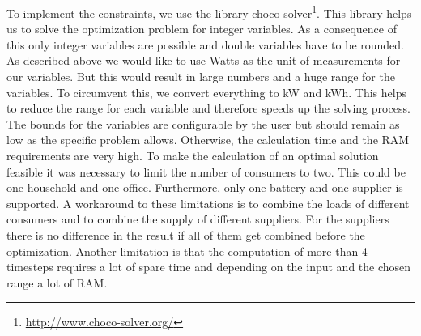 To implement the constraints, we use the library choco solver\footnote{\url{http://www.choco-solver.org/}}. This library helps us to solve the optimization problem for integer variables. As a consequence of this only integer variables are possible and double variables have to be rounded. As described above we would like to use Watts as the unit of measurements for our variables. But this would result in large numbers and a huge range for the variables. To circumvent this, we convert everything to kW and kWh. This helps to reduce the range for each variable and therefore speeds up the solving process. The bounds for the variables are configurable by the user but should remain as low as the specific problem allows. Otherwise, the calculation time and the RAM requirements are very high. To make the calculation of an optimal solution feasible it was necessary to limit the number of consumers to two. This could be one household and one office. Furthermore, only one battery and one supplier is supported. A workaround to these limitations is to combine the loads of different consumers and to combine the supply of different suppliers. For the suppliers there is no difference in the result if all of them get combined before the optimization. Another limitation is that the computation of more than 4 timesteps requires a lot of spare time and depending on the input and the chosen range a lot of RAM.